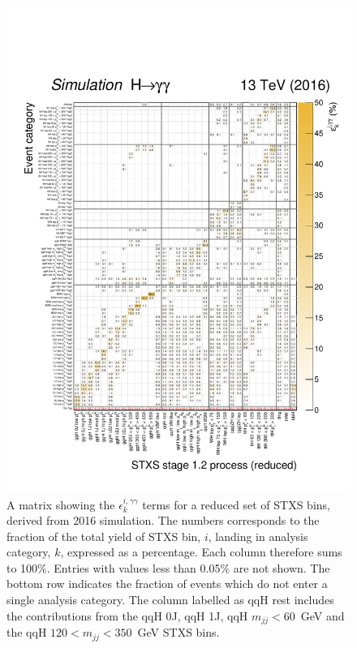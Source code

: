 \begin{figure}[hptb]
  \centering
  \includegraphics[width=1\textwidth]{Figures/hgg_stats/migrationMatrix_2016_thesis.pdf}
  \caption[Efficiency times acceptance matrix from 2016 simulation]
  {
    A matrix showing the $\epsilon^{i,\gamma\gamma}_{k}$ terms for a reduced set of STXS bins, derived from 2016 simulation. The numbers corresponds to the fraction of the total yield of STXS bin, $i$, landing in analysis category, $k$, expressed as a percentage. Each column therefore sums to 100\%. Entries with values less than 0.05\% are not shown. The bottom row indicates the fraction of events which do not enter a single analysis category. The column labelled as qqH rest includes the contributions from the qqH 0J, qqH 1J, qqH $m_{jj}<60$~GeV and the qqH $120<m_{jj}<350$~GeV STXS bins.
  }
  \label{fig:ea_2016}
\end{figure}


